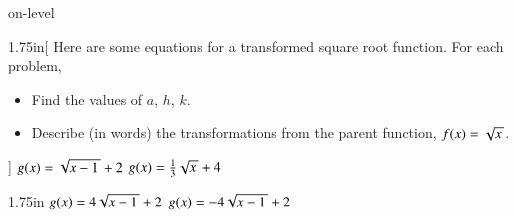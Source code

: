 \begin{taggedblock}{on-level}

\begin{my2Problems}[\normalsize]{1.75in}[%
    Here are some equations for a transformed square root function.
    For each problem,
    \vspace{-1em}
    \begin{itemize}[nosep]
        \item Find the values of $a$, $h$, $k$. 
        \item Describe (in words) the transformations from the parent function, $f(x)=\myRoot{x}$.
    \end{itemize}
    ]
    {
        $g(x) = \myRoot{x-1}+2$
    }
    {
        $g(x) = \frac{1}{3}\myRoot{x} + 4$
    }
\end{my2Problems}
\begin{my2Problems}[\normalsize]{1.75in}
    {
        $g(x) = 4\myRoot{x-1}+2$
    }
    {
        $g(x) = -4\myRoot{x-1}+2$
    }
\end{my2Problems}



\end{taggedblock}
